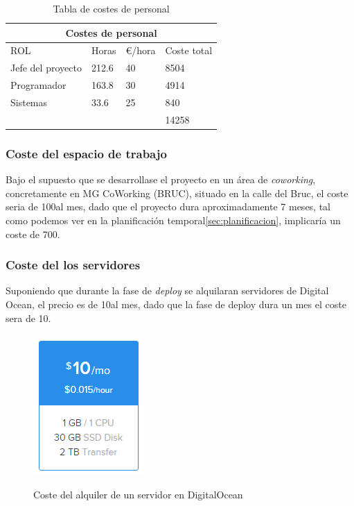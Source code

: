 \begin{table}
\setlength{\arrayrulewidth}{1mm}
\setlength{\tabcolsep}{12pt}
\renewcommand{\arraystretch}{2.5}
{
\begin{tabular}{ |p{2cm}|p{2cm}|p{2cm}|p{2cm}|}
\hline
\multicolumn{4}{|c|}{Costes de personal} \\
\hline
ROL &Horas & \euro /hora &Coste total \\
\hline
Jefe del proyecto &212.6 &40 & 8504\\
Programador &163.8 &30 & 4914\\
Sistemas &33.6 &25 &840\\
&&& 14258\\
\hline
\end{tabular}
}
\caption{Tabla de costes de personal}
\label{tab:cost_tab}
\end{table}
\newpage
\subsubsection{Coste del espacio de trabajo}

Bajo el supuesto que se desarrollase el proyecto en un área de \textit{coworking}, concretamente en MG CoWorking (BRUC), situado en la calle del Bruc, el coste seria de 100\euros al mes, dado que el proyecto dura aproximadamente 7 meses, tal como podemos ver en la planificación temporal\ref{sec:planificacion}, implicaría un coste de 700\euros.

\subsubsection{Coste del los servidores}
Suponiendo que durante la fase de \textit{deploy} se alquilaran servidores de Digital Ocean, el precio es de 10\euros al mes, dado que la fase de deploy dura un mes el coste sera de 10\euros .\\
\begin{figure}[ht!]
	\center
	\includegraphics[scale=1.0]{add/do_server.PNG}
	\label{fig:Precio y especificaciones del servidor}
	\caption{Coste del alquiler de un servidor en DigitalOcean}
\end{figure}
\newpage

